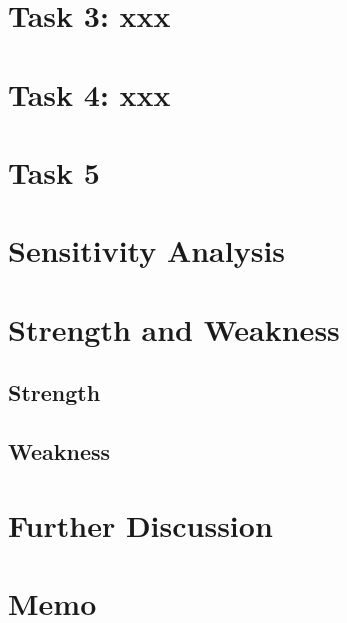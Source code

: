 \documentclass{mcmthesis}
\begin{document}
	
	
	
	
	
	
	
	
	
	
	
	
	
	
	
	
	
	
	
	
	\section{Task 3: xxx}
	
	
	\section{Task 4: xxx}
	
	\section{Task 5}
	
	\section{Sensitivity Analysis}
	
	\section{Strength and Weakness}
	\subsection{Strength}
	\subsection{Weakness}
	
	\section{Further Discussion}
	
	
	
	\newpage
	\section*{Memo} %
	
\end{document}
